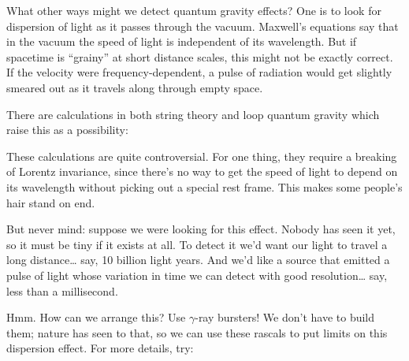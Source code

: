 \documentclass{article}
\def\tightlist{}
\renewcommand{\texttt}[1]{%
  \begingroup
  \ttfamily
  \begingroup\lccode`~=`/\lowercase{\endgroup\def~}{/\discretionary{}{}{}}%
  \begingroup\lccode`~=`[\lowercase{\endgroup\def~}{[\discretionary{}{}{}}%
  \begingroup\lccode`~=`.\lowercase{\endgroup\def~}{.\discretionary{}{}{}}%
  \catcode`/=\active\catcode`[=\active\catcode`.=\active
  \scantokens{#1\noexpand}%
  \endgroup
}
\begin{document}
What other ways might we detect quantum gravity effects? One is to look
for dispersion of light as it passes through the vacuum. Maxwell's
equations say that in the vacuum the speed of light is independent of
its wavelength. But if spacetime is ``grainy'' at short distance scales,
this might not be exactly correct. If the velocity were
frequency-dependent, a pulse of radiation would get slightly smeared out
as it travels along through empty space.

There are calculations in both string theory and loop quantum gravity
which raise this as a possibility:


These calculations are quite controversial. For one thing, they require
a breaking of Lorentz invariance, since there's no way to get the speed
of light to depend on its wavelength without picking out a special rest
frame. This makes some people's hair stand on end.

But never mind: suppose we were looking for this effect. Nobody has seen
it yet, so it must be tiny if it exists at all. To detect it we'd want
our light to travel a long distance\ldots{} say, 10 billion light years.
And we'd like a source that emitted a pulse of light whose variation in
time we can detect with good resolution\ldots{} say, less than a
millisecond.

Hmm. How can we arrange this? Use \(\gamma\)-ray bursters! We don't have
to build them; nature has seen to that, so we can use these rascals to
put limits on this dispersion effect. For more details, try:

\end{document}
